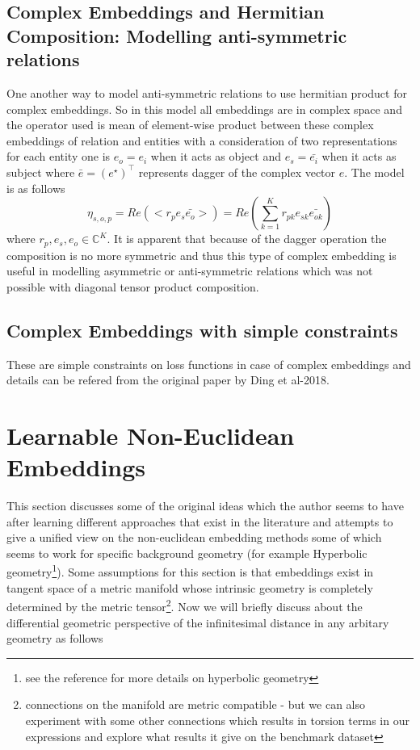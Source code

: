 \documentclass[12pt]{article}
\begin{document}
\subsection{Complex Embeddings and Hermitian Composition: Modelling anti-symmetric relations}
One another way to model anti-symmetric relations to use hermitian product for complex embeddings. So in this model all embeddings are in complex space and the operator used is mean of element-wise product between these complex embeddings of relation and entities with a consideration of two representations for each entity one is $e_{o}=e_{i}$ when it acts as object and $e_{s}=\bar{e_{i}}$ when it acts as subject where $\bar{e}=(e^{\star})^{\intercal}$ represents dagger of the complex vector $e$. The model is as follows
\begin{equation}
\eta_{s, o, p} = Re(<r_{p}e_{s}\bar{e_{o}}>) = Re(\sum_{k=1}^{K}r_{pk}e_{sk}\bar{e_{ok}})
\end{equation} where $r_{p}, e_{s}, e_{o} \in \mathbb{C}^{K}$. It is apparent that because of the dagger operation the composition is no more symmetric and thus this type of complex embedding is useful in modelling asymmetric or anti-symmetric relations which was not possible with diagonal tensor product composition.
\subsection{Complex Embeddings with simple constraints}
These are simple constraints on loss functions in case of complex embeddings and details can be refered from the original paper by Ding et al-2018.
\section{Learnable Non-Euclidean Embeddings}
This section discusses some of the original ideas which the author seems to have after learning different approaches that exist in the literature and attempts to give a unified view on the non-euclidean embedding methods some of which seems to work for specific background geometry (for example Hyperbolic geometry\footnote{see the reference for more details on hyperbolic geometry}). Some assumptions for this section is that embeddings exist in tangent space of a metric manifold whose intrinsic geometry is completely determined by the metric tensor\footnote{connections on the manifold are metric compatible - but we can also experiment with some other connections which results in torsion terms in our expressions and explore what results it give on the benchmark dataset}. Now we will briefly discuss about the differential geometric perspective of the infinitesimal distance in any arbitary geometry as follows
\end{document}
